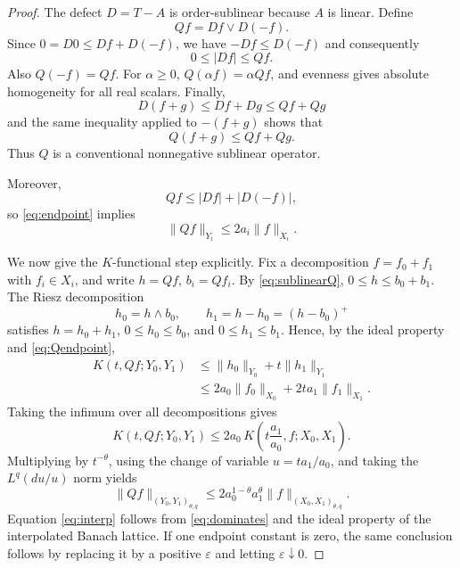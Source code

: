 \documentclass[11pt]{article}
\newcommand{\Dop}{D}
\newcommand{\Qop}{Q}
\newcommand{\Kfun}{K}
\begin{document}
\begin{proof}
The defect $\Dop=T-A$ is order-sublinear because $A$ is linear. Define
\[
 \Qop f=\Dop f\vee\Dop(-f).
\]
Since $0=\Dop0\leq\Dop f+\Dop(-f)$, we have
$-\Dop f\leq\Dop(-f)$ and consequently
\begin{equation}\label{eq:dominates}
 0\leq |\Dop f|\leq\Qop f.
\end{equation}
Also $\Qop(-f)=\Qop f$. For $\alpha\geq0$,
$\Qop(\alpha f)=\alpha\Qop f$, and evenness gives absolute homogeneity for
all real scalars. Finally,
\[
 \Dop(f+g)\leq\Dop f+\Dop g\leq\Qop f+\Qop g
\]
and the same inequality applied to $-(f+g)$ shows that
\begin{equation}\label{eq:sublinearQ}
 \Qop(f+g)\leq\Qop f+\Qop g.
\end{equation}
Thus $\Qop$ is a conventional nonnegative sublinear operator.

Moreover,
\[
 \Qop f\leq |\Dop f|+|\Dop(-f)|,
\]
so \eqref{eq:endpoint} implies
\begin{equation}\label{eq:Qendpoint}
 \|\Qop f\|_{Y_i}\leq2a_i\|f\|_{X_i}.
\end{equation}

We now give the $K$-functional step explicitly. Fix a decomposition
$f=f_0+f_1$ with $f_i\in X_i$, and write
$h=\Qop f$, $b_i=\Qop f_i$. By \eqref{eq:sublinearQ},
$0\leq h\leq b_0+b_1$. The Riesz decomposition
\[
 h_0=h\wedge b_0,\qquad h_1=h-h_0=(h-b_0)^+
\]
satisfies $h=h_0+h_1$, $0\leq h_0\leq b_0$, and
$0\leq h_1\leq b_1$. Hence, by the ideal property and
\eqref{eq:Qendpoint},
\begin{align*}
 \Kfun(t,\Qop f;Y_0,Y_1)
 &\leq \|h_0\|_{Y_0}+t\|h_1\|_{Y_1}\\
 &\leq 2a_0\|f_0\|_{X_0}+2ta_1\|f_1\|_{X_1}.
\end{align*}
Taking the infimum over all decompositions gives
\begin{equation}\label{eq:Kdomination}
 \Kfun(t,\Qop f;Y_0,Y_1)
 \leq 2a_0\,
 \Kfun\!\left(t\frac{a_1}{a_0},f;X_0,X_1\right).
\end{equation}
Multiplying by $t^{-\theta}$, using the change of variable
$u=ta_1/a_0$, and taking the $L^q(du/u)$ norm yields
\[
 \|\Qop f\|_{(Y_0,Y_1)_{\theta,q}}
 \leq2a_0^{1-\theta}a_1^\theta
 \|f\|_{(X_0,X_1)_{\theta,q}}.
\]
Equation \eqref{eq:interp} follows from \eqref{eq:dominates} and the
ideal property of the interpolated Banach lattice. If one endpoint
constant is zero, the same conclusion follows by replacing it by a positive
$\varepsilon$ and letting $\varepsilon\downarrow0$.
\end{proof}
\end{document}
